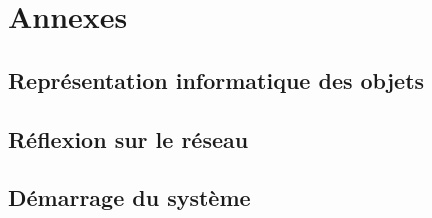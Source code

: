 \section{Annexes}
\subsection{Représentation informatique des objets}
\subsection{Réflexion sur le réseau}
\subsection{Démarrage du système}
